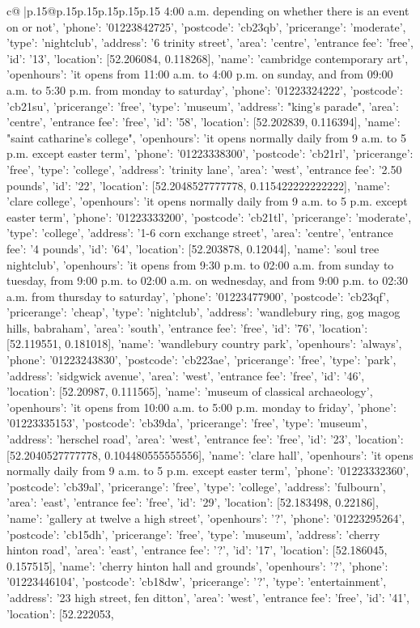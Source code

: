 \documentclass{article}
\begin{document}
{\begin{supertabular}{c@{$\;$}|p{.15\linewidth}@{}p{.15\linewidth}p{.15\linewidth}p{.15\linewidth}p{.15\linewidth}p{.15\linewidth}}
{{{4:00 a.m. depending on whether there is an event on or not', 'phone': '01223842725', 'postcode': 'cb23qb', 'pricerange': 'moderate', 'type': 'nightclub'}, {'address': '6 trinity street', 'area': 'centre', 'entrance fee': 'free', 'id': '13', 'location': [52.206084, 0.118268], 'name': 'cambridge contemporary art', 'openhours': 'it opens from 11:00 a.m. to 4:00 p.m. on sunday, and from 09:00 a.m. to 5:30 p.m. from monday to saturday', 'phone': '01223324222', 'postcode': 'cb21su', 'pricerange': 'free', 'type': 'museum'}, {'address': "king's parade", 'area': 'centre', 'entrance fee': 'free', 'id': '58', 'location': [52.202839, 0.116394], 'name': "saint catharine's college", 'openhours': 'it opens normally daily from 9 a.m. to 5 p.m. except easter term', 'phone': '01223338300', 'postcode': 'cb21rl', 'pricerange': 'free', 'type': 'college'}, {'address': 'trinity lane', 'area': 'west', 'entrance fee': '2.50 pounds', 'id': '22', 'location': [52.2048527777778, 0.115422222222222], 'name': 'clare college', 'openhours': 'it opens normally daily from 9 a.m. to 5 p.m. except easter term', 'phone': '01223333200', 'postcode': 'cb21tl', 'pricerange': 'moderate', 'type': 'college'}, {'address': '1-6 corn exchange street', 'area': 'centre', 'entrance fee': '4 pounds', 'id': '64', 'location': [52.203878, 0.12044], 'name': 'soul tree nightclub', 'openhours': 'it opens from 9:30 p.m. to 02:00 a.m. from sunday to tuesday, from 9:00 p.m. to 02:00 a.m. on wednesday, and from 9:00 p.m. to 02:30 a.m. from thursday to saturday', 'phone': '01223477900', 'postcode': 'cb23qf', 'pricerange': 'cheap', 'type': 'nightclub'}, {'address': 'wandlebury ring, gog magog hills, babraham', 'area': 'south', 'entrance fee': 'free', 'id': '76', 'location': [52.119551, 0.181018], 'name': 'wandlebury country park', 'openhours': 'always', 'phone': '01223243830', 'postcode': 'cb223ae', 'pricerange': 'free', 'type': 'park'}, {'address': 'sidgwick avenue', 'area': 'west', 'entrance fee': 'free', 'id': '46', 'location': [52.20987, 0.111565], 'name': 'museum of classical archaeology', 'openhours': 'it opens from 10:00 a.m. to 5:00 p.m. monday to friday', 'phone': '01223335153', 'postcode': 'cb39da', 'pricerange': 'free', 'type': 'museum'}, {'address': 'herschel road', 'area': 'west', 'entrance fee': 'free', 'id': '23', 'location': [52.2040527777778, 0.104480555555556], 'name': 'clare hall', 'openhours': 'it opens normally daily from 9 a.m. to 5 p.m. except easter term', 'phone': '01223332360', 'postcode': 'cb39al', 'pricerange': 'free', 'type': 'college'}, {'address': 'fulbourn', 'area': 'east', 'entrance fee': 'free', 'id': '29', 'location': [52.183498, 0.22186], 'name': 'gallery at twelve a high street', 'openhours': '?', 'phone': '01223295264', 'postcode': 'cb15dh', 'pricerange': 'free', 'type': 'museum'}, {'address': 'cherry hinton road', 'area': 'east', 'entrance fee': '?', 'id': '17', 'location': [52.186045, 0.157515], 'name': 'cherry hinton hall and grounds', 'openhours': '?', 'phone': '01223446104', 'postcode': 'cb18dw', 'pricerange': '?', 'type': 'entertainment'}, {'address': '23 high street, fen ditton', 'area': 'west', 'entrance fee': 'free', 'id': '41', 'location': [52.222053, }}}
\end{supertabular}}
\end{document}
